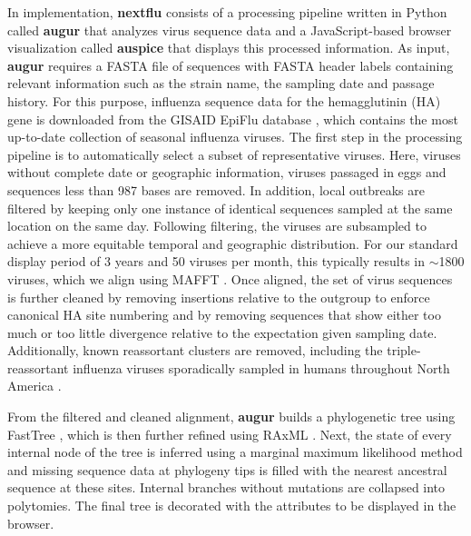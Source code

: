 \documentclass{bioinfo}
\newcommand{\augur}{\textbf{augur}}
\newcommand{\auspice}{\textbf{auspice}}
\newcommand{\nextflu}{\textbf{nextflu}}
\begin{document}
In implementation, \nextflu{} consists of a processing pipeline written in Python called \augur{} that analyzes virus sequence data and a JavaScript-based browser visualization called \auspice{} that displays this processed information.
As input, \augur{} requires a FASTA file of sequences with FASTA header labels containing relevant information such as the strain name, the sampling date and passage history.
For this purpose, influenza sequence data for the hemagglutinin (HA) gene is downloaded from the GISAID EpiFlu database \citep{GISAID}, which contains the most up-to-date collection of seasonal influenza viruses.
The first step in the processing pipeline is to automatically select a subset of representative viruses.
Here, viruses without complete date or geographic information, viruses passaged in eggs and sequences less than 987 bases are removed.
In addition, local outbreaks are filtered by keeping only one instance of identical sequences sampled at the same location on the same day.
Following filtering, the viruses are subsampled to achieve a more equitable temporal and geographic distribution.
For our standard display period of 3 years and 50 viruses per month, this typically results in $\sim$1800 viruses, which we align using MAFFT \citep{katoh_mafft_2013}.
Once aligned, the set of virus sequences is further cleaned by removing insertions relative to the outgroup to enforce canonical HA site numbering and by removing sequences that show either too much or too little divergence relative to the expectation given sampling date.
Additionally, known reassortant clusters are removed, including the triple-reassortant influenza viruses sporadically sampled in humans throughout North America \citep{bastien_human_2010}.

From the filtered and cleaned alignment, \augur{} builds a phylogenetic tree using FastTree \citep{price_fasttree_2009}, which is then further refined using RAxML \citep{stamatakis_raxml_2014}.
Next, the state of every internal node of the tree is inferred using a marginal maximum likelihood method and missing sequence data at phylogeny tips is filled with the nearest ancestral sequence at these sites.
Internal branches without mutations are collapsed into polytomies.
The final tree is decorated with the attributes to be displayed in the browser. %
\end{document}

